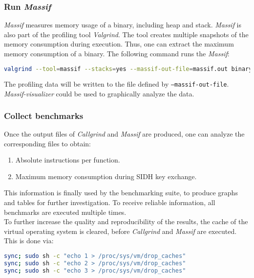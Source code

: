 \subsubsection{Run \textit{Massif}}
\textit{Massif} measures memory usage of a binary, including heap and stack. \textit{Massif} is also part of the profiling tool \textit{Valgrind}. The tool creates multiple snapshots of the memory consumption during execution. Thus, one can extract the maximum memory consumption of a binary. The following command runs the \textit{Massif}:
\begin{lstlisting}[language=Bash]
valgrind --tool=massif --stacks=yes --massif-out-file=massif.out binary
\end{lstlisting}
The profiling data will be written to the file defined by \texttt{--massif-out-file}. \textit{Massif-visualizer} could be used to graphically analyze the data.

\subsubsection{Collect benchmarks}
Once the output files of \textit{Callgrind} and \textit{Massif} are produced, one can analyze the corresponding files to obtain:
\begin{enumerate}
\item Absolute instructions per function.
\item Maximum memory consumption during SIDH key exchange.
\end{enumerate}
This information is finally used by the benchmarking suite, to produce graphs and tables for further investigation. To receive reliable information, all benchmarks are executed multiple times.\\
To further increase the quality and reproducibility of the results, the cache of the virtual operating system is cleared, before \textit{Callgrind} and \textit{Massif} are executed. This is done via:
\begin{lstlisting}[language=Bash]
sync; sudo sh -c "echo 1 > /proc/sys/vm/drop_caches"
sync; sudo sh -c "echo 2 > /proc/sys/vm/drop_caches"
sync; sudo sh -c "echo 3 > /proc/sys/vm/drop_caches"
\end{lstlisting}


